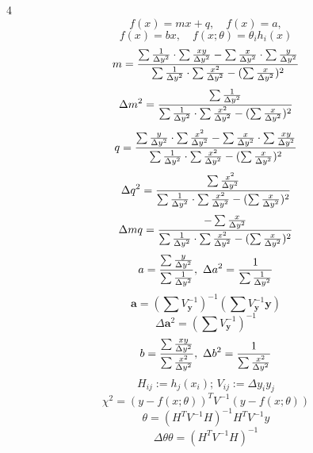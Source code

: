 \documentclass[a4paper]{article}
\newcommand*\D{\Delta}
\newcommand*\titlet[1]{\textbf{\xmakefirstuc{#1}}}
\newenvironment{formulae}[2]{%
\vspace{-15pt}
\begin{multicols}{#1}
\noindent\titlet{#2}}
{\end{multicols}}
\begin{document}
\begin{formulae}{4}{fit (ML)}
	\[f(x)=mx+q,\quad f(x)=a,\]
	\[f(x)=bx,\quad f(x;\theta)=\theta_ih_i(x)\]
	\[m=\frac{\sum\inv{\D y^2}\cdot\sum\frac{xy}{\D y^2}-\sum\frac{x}{\D y^2}\cdot\sum\frac{y}{\D y^2}}{\sum\inv{\D y^2}\cdot\sum\frac{x^2}{\D y^2}-(\sum\frac x{\D y^2})^2}\]
	\[\D m^2=\frac{\sum\inv{\D y^2}}{\sum\inv{\D y^2}\cdot\sum\frac{x^2}{\D y^2}-(\sum\frac{x}{\D y^2})^2}\]
	\[q=\frac{\sum\frac y{\D y^2}\cdot\sum\frac{x^2}{\D y^2}-\sum\frac x{\D y^2}\cdot\sum\frac{xy}{\D y^2}}{\sum\inv{\D y^2}\cdot\sum\frac{x^2}{\D y^2}-(\sum\frac x{\D y^2})^2}\]
	\[\D q^2=\frac{\sum\frac{x^2}{\D y^2}}{\sum\inv{\D y^2}\cdot\sum\frac{x^2}{\D y^2}-(\sum\frac{x}{\D y^2})^2}
	\]
	\[\Delta mq=\frac{-\sum\frac x{\D y^2}}{\sum\inv{\D y^2}\cdot\sum\frac{x^2}{\D y^2}-(\sum\frac{x}{\D y^2})^2}\]
	\[a=\frac{\sum\frac y{\D y^2}}{\sum\inv{\D y^2}},\ \D a^2=\inv{\sum\inv{\D y^2}}\]
	\[\mathbf a=(\sum V_\mathbf y^{-1})^{-1}(\sum V_\mathbf y^{-1}\mathbf y)\]
	\[\D\mathbf a^2=(\sum V_\mathbf y^{-1})^{-1}\]
	\[b=\frac{\sum\frac{xy}{\D y^2}}{\sum\frac{x^2}{\D y^2}},\ \D b^2=\inv{\sum\frac{x^2}{\D y^2}}\]
	\[H_{ij}:=h_j(x_i);\,V_{ij}:=\Delta y_iy_j\]
	\[\chi^2=(y-f(x;\theta))^TV^{-1}(y-f(x;\theta))\]
	\[\theta=(H^TV^{-1}H)^{-1}H^TV^{-1}y\]
	\[\Delta\theta\theta=(H^TV^{-1}H)^{-1}\]
\end{formulae}
\end{document}
